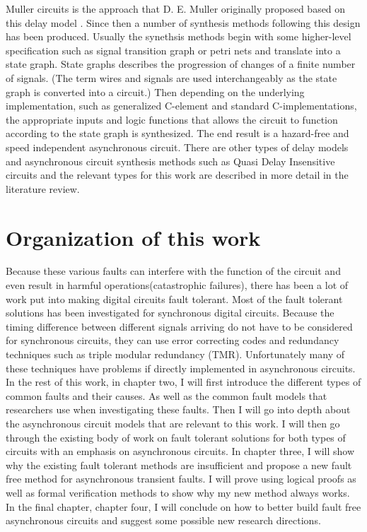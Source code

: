 \documentclass[12pt]{report}
\begin{document}
Muller circuits is the approach that D. E. Muller originally proposed based on this delay model \cite{Muller_59}.  Since then a number of synthesis methods following this design has been produced.  Usually the synethsis methods begin with some higher-level specification such as signal transition graph or petri nets and translate into a state graph.  State graphs describes the progression of changes of a finite number of signals.  (The term wires and signals are used interchangeably as the state graph is converted into a circuit.)  Then depending on the underlying implementation, such as generalized C-element and standard C-implementations, the appropriate inputs and logic functions that allows the circuit to function according to the state graph is synthesized.  The end result is a hazard-free and speed independent asynchronous circuit.   
There are other types of delay models and asynchronous circuit synthesis methods such as Quasi Delay Insensitive circuits and the relevant types for this work are described in more detail in the literature review.  \\  %

\section{Organization of this work}
Because these various faults can interfere with the function of the circuit and even result in harmful operations(catastrophic failures), there has been a lot of work put into making digital circuits fault tolerant. Most of the fault tolerant solutions has been investigated for synchronous digital circuits.  Because the timing difference between different signals arriving do not have to be considered for synchronous circuits, they can use error correcting codes and redundancy techniques such as triple modular redundancy (TMR). Unfortunately many of these techniques have problems if directly implemented in asynchronous circuits.\\

In the rest of this work, in chapter two, I will first introduce the different types of common faults and their causes.  As well as the common fault models that researchers use when investigating these faults.  Then I will go into depth about the asynchronous circuit models that are relevant to this work.  I will then go through the existing body of work on fault tolerant solutions for both types of circuits with an emphasis on asynchronous circuits.  In chapter three, I will show why the existing fault tolerant methods are insufficient and propose a new fault free method for asynchronous transient faults.  I will prove using logical proofs as well as formal verification methods to show why my new method always works.  In the final chapter, chapter four, I will conclude on how to better build fault free asynchronous circuits and suggest some possible new research directions.
\end{document}
